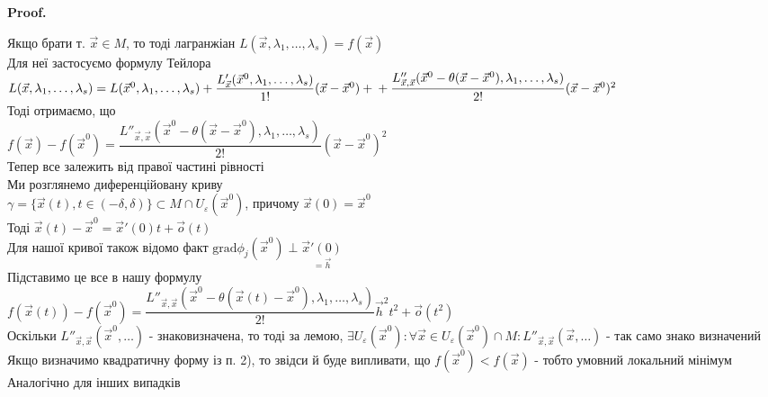 \documentclass[a4paper, 10pt]{article}
\makeatletter
\def\qed{$\blacksquare$}
\theoremstyle{theoremdd}
\theoremstyle{theoremdd}
\theoremstyle{theoremdd}
\theoremstyle{theoremdd}
\theoremstyle{theoremdd}
\theoremstyle{theoremdd}
\theoremstyle{theoremdd}
\theoremstyle{theoremdd}
\renewenvironment{proof}[1][Proof.\\]{\par
\pushQED{\hfill \qed}%
\normalfont \topsep6\p@\@plus6\p@\relax
\trivlist
\item\relax
{\bfseries
#1\@addpunct{.}}\hspace\labelsep\ignorespaces
}{%
\popQED\endtrivlist\@endpefalse
}
\makeatother
\begin{document}
\begin{proof}
Якщо брати т. $\vec{x} \in M$, то тоді лагранжіан $L(\vec{x}, \lambda_1, \dots, \lambda_s) = f(\vec{x})$\\
Для неї застосуємо формулу Тейлора\\
$L(\vec{x}, \lambda_1, \dots, \lambda_s) = L(\vec{x}^0, \lambda_1,\dots,\lambda_s) + \dfrac{L'_{\vec{x}}(\vec{x}^0,\lambda_1,\dots,\lambda_s)}{1!}(\vec{x}-\vec{x}^0) + \\ + \dfrac{L''_{\vec{x},\vec{x}}(\vec{x}^0 - \theta(\vec{x}-\vec{x}^0), \lambda_1,\dots,\lambda_s)}{2!}(\vec{x}-\vec{x}^0)^2$\\
Тоді отримаємо, що\\
$f(\vec{x})-f(\vec{x}^0) = \dfrac{L''_{\vec{x},\vec{x}}(\vec{x}^0 - \theta(\vec{x}-\vec{x}^0), \lambda_1,\dots,\lambda_s)}{2!}(\vec{x}-\vec{x}^0)^2$\\
Тепер все залежить від правої частині рівності\\
Ми розглянемо диференційовану криву \\ $\gamma = \{\vec{x}(t), t \in (-\delta,\delta) \} \subset M \cap U_{\varepsilon}(\vec{x}^0)$, причому $\vec{x}(0)=\vec{x}^0$\\
Тоді $\vec{x}(t) - \vec{x}^0 = \vec{x}'(0)t + \vec{o}(t)$\\
Для нашої кривої також відомо факт $\textrm{grad} \phi_j (\vec{x}^0) \perp \underset{=\vec{h}}{\vec{x}'(0)}$\\
Підставимо це все в нашу формулу\\
$f(\vec{x}(t)) -f(\vec{x}^0) = \dfrac{L''_{\vec{x},\vec{x}}(\vec{x}^0 - \theta(\vec{x}(t)-\vec{x}^0), \lambda_1,\dots,\lambda_s)}{2!}\vec{h}^2 t^2 + \vec{o}(t^2)$\\
Оскільки $L''_{\vec{x},\vec{x}}(\vec{x}^0,\dots)$ - знаковизначена, то тоді за лемою, $\exists U_{\varepsilon}(\vec{x}^0): \forall \vec{x} \in U_{\varepsilon}(\vec{x}^0) \cap M: L''_{\vec{x},\vec{x}}(\vec{x},\dots)$ - так само знако визначений\\
Якщо визначимо квадратичну форму із п. 2), то звідси й буде випливати, що $f(\vec{x}^0) < f(\vec{x})$ - тобто умовний локальний мінімум\\
Аналогічно для інших випадків
\end{proof}
\end{document}
